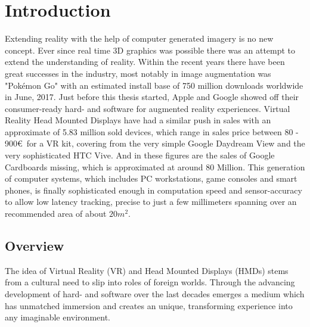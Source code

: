 %
\chapter{Introduction}
\label{sec:intro}


Extending reality with the help of computer generated imagery is no new 
concept. Ever since real time 3D graphics was possible there was an attempt to 
extend the understanding of reality. Within the recent years there have been 
great successes in the industry, most notably in image augmentation was 
"Pokémon Go" with an estimated install base of 750 million downloads 
worldwide in June, 2017. \cite{appannie:2017}  Just before this thesis 
started, Apple and Google showed off their consumer-ready hard- and software 
for augmented reality experiences. 
\newline
Virtual Reality Head Mounted Displays have had a similar push in sales with an 
approximate of 5.83 million sold devices, which range in sales price between 
80 - 900€ for a VR kit, covering from the very simple Google Daydream View and 
the very sophisticated HTC Vive. \cite{erguerel:2017} And in these figures are 
the sales of Google Cardboards missing, which is approximated at around 80  
Million\cite{superdata:market-brief:2017}.
\newline
This generation of computer systems, which includes PC workstations, game 
consoles and smart phones, is finally sophisticated enough in computation speed 
and sensor-accuracy to allow low latency tracking, precise to just a few 
millimeters spanning over an recommended area of about 
$20m^2$\cite{htc:vive-manual:2016}.

\section{Overview}
\label{sec:intro:outline}

The idea of Virtual Reality (VR) and Head Mounted Displays (HMDs) stems from a 
cultural need to slip into roles of foreign worlds. Through the advancing 
development of hard- and software over the last decades emerges a medium which 
has unmatched immersion and creates an unique, transforming experience into any 
imaginable environment.

